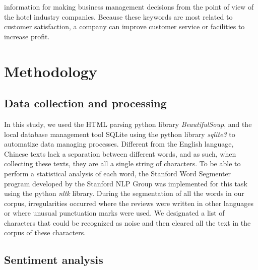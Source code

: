 \documentclass[review]{elsarticle}
\begin{document}
information for making business management decisions from the point of view of the hotel industry companies. Because these keywords are most related to customer satisfaction, a company can improve customer service or facilities to increase profit. 

\section{Methodology}

\subsection{Data collection and processing}

In this study, we used the HTML parsing python library \textit{BeautifulSoup}, and the local database management tool SQLite  using the python library \textit{sqlite3} to automatize data managing processes. Different from the English language, Chinese texts lack a separation between different words, and as such, when collecting these texts, they are all a single string of characters. To be able to perform a statistical analysis of each word, the Stanford Word Segmenter\cite[][]{chang2008} program developed by the Stanford NLP Group was implemented for this task using the python \textit{nltk} library. During the segmentation of all the words in our corpus, irregularities occurred where the reviews were written in other languages or where unusual punctuation marks were used. We designated a list of characters that could be recognized as noise and then cleared all the text in the corpus of these characters.

\subsection{Sentiment analysis}
\end{document}
